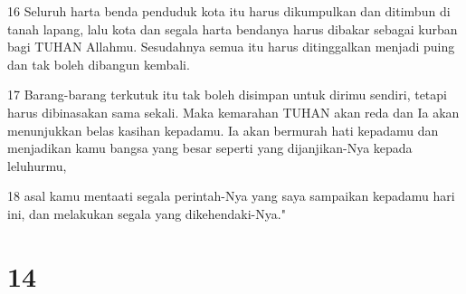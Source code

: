 \par 16 Seluruh harta benda penduduk kota itu harus dikumpulkan dan ditimbun di tanah lapang, lalu kota dan segala harta bendanya harus dibakar sebagai kurban bagi TUHAN Allahmu. Sesudahnya semua itu harus ditinggalkan menjadi puing dan tak boleh dibangun kembali.
\par 17 Barang-barang terkutuk itu tak boleh disimpan untuk dirimu sendiri, tetapi harus dibinasakan sama sekali. Maka kemarahan TUHAN akan reda dan Ia akan menunjukkan belas kasihan kepadamu. Ia akan bermurah hati kepadamu dan menjadikan kamu bangsa yang besar seperti yang dijanjikan-Nya kepada leluhurmu,
\par 18 asal kamu mentaati segala perintah-Nya yang saya sampaikan kepadamu hari ini, dan melakukan segala yang dikehendaki-Nya."

\chapter{14}

